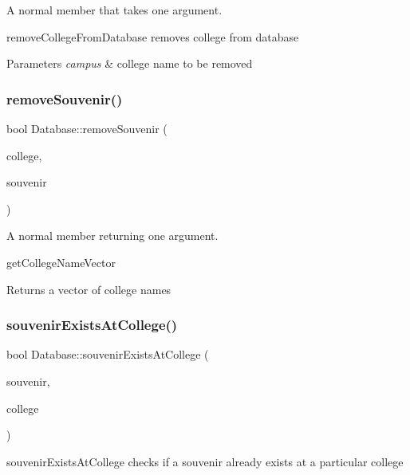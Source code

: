 A normal member that takes one argument. 

remove\+College\+From\+Database removes college from database 
\begin{DoxyParams}{Parameters}
{\em campus} & college name to be removed \\
\hline
\end{DoxyParams}
\mbox{\label{class_database_aae3e40f0501e75700b93548d83b76cfd}} 
\subsubsection{\texorpdfstring{remove\+Souvenir()}{removeSouvenir()}}
{\footnotesize\ttfamily bool Database\+::remove\+Souvenir (\begin{DoxyParamCaption}\item[{Q\+String}]{college,  }\item[{Q\+String}]{souvenir }\end{DoxyParamCaption})}



A normal member returning one argument. 

get\+College\+Name\+Vector \begin{DoxyReturn}{Returns}
a vector of college names 
\end{DoxyReturn}
\mbox{\label{class_database_a44af624b2b73c7ef7f75ca625302771f}} 
\subsubsection{\texorpdfstring{souvenir\+Exists\+At\+College()}{souvenirExistsAtCollege()}}
{\footnotesize\ttfamily bool Database\+::souvenir\+Exists\+At\+College (\begin{DoxyParamCaption}\item[{Q\+String}]{souvenir,  }\item[{Q\+String}]{college }\end{DoxyParamCaption})}



souvenir\+Exists\+At\+College checks if a souvenir already exists at a particular college 


